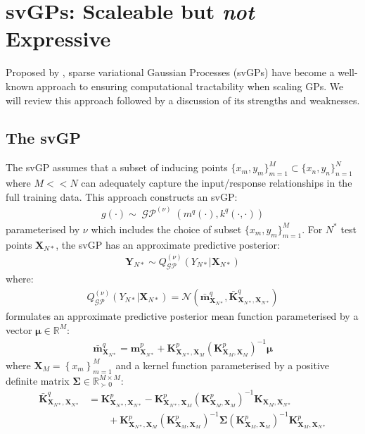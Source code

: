 \documentclass{article}
\newcommand{\GP}{\operatorname{\mathcal{GP}}}
\numberwithin{equation}{section}
\begin{document}
\newpage
\section{svGPs: Scaleable but \textit{not} Expressive}\label{section:the-svgp}
Proposed by \cite{titsias2009variational}, sparse variational Gaussian Processes (svGPs) have become a well-known approach to ensuring computational tractability when scaling GPs. We will review this approach followed by a discussion of its strengths and weaknesses.

\subsection{The svGP}
The svGP assumes that a subset of inducing points $\{x_m, y_m\}_{m=1}^{M} \subset \{x_n, y_n\}_{n=1}^{N}$ where $M << N$ can adequately capture the input/response relationships in the full training data. This approach constructs an svGP:
\begin{align}
g(\cdot) \sim \GP^{(\nu)}\left(m^{q}(\cdot), k^{q}(\cdot, \cdot)\right)
\label{svgp}
\end{align}
parameterised by $\nu$ which includes the choice of subset $\{x_m, y_m\}_{m=1}^{M}$. For $N^*$ test points $\mathbf{X}_{N*}$, the svGP has an approximate predictive posterior:
\begin{align}
    \mathbf{Y}_{N*} \sim Q_{\GP}^{(\nu)}\left(Y_{N*} \vert \mathbf{X}_{N*}\right)
\end{align}
where:
\begin{align}
    Q_{\GP}^{(\nu)}\left(Y_{N*} \vert \mathbf{X}_{N*}\right) = \mathcal{N}\left(\bar{\mathbf{m}}_{\mathbf{X}_{N*}}^{q}, \bar{\mathbf{K}}_{\mathbf{X}_{N*}, \mathbf{X}_{N*}}^{q}\right)
\end{align}
\cite{titsias2009variational} formulates an approximate predictive posterior mean function parameterised by a vector $\boldsymbol{\mu} \in \mathbb{R}^M$:
\begin{align}
    \label{svgp-mean} 
    \bar{\mathbf{m}}_{\mathbf{X}_{N*}}^{q} = \mathbf{m}^p_{\mathbf{X}_{N*}} + \mathbf{K}^p_{\mathbf{X}_{N*}, \mathbf{X}_M}\left(\mathbf{K}^p_{\mathbf{X}_M,\mathbf{X}_M}\right)^{-1} \boldsymbol{\mu}
\end{align}
where $\mathbf{X}_M = \left\{ x_m\right\}_{m=1}^M$ and a kernel function parameterised by a positive definite matrix $\mathbf{\Sigma} \in \mathbb{R}^{M\times M}_{\succ 0}$:
\begin{align}
\bar{\mathbf{K}}_{\mathbf{X}_{N*}, \mathbf{X}_{N*}}^{q} & = \mathbf{K}^p_{\mathbf{X}_{N*}, \mathbf{X}_{N*}} - \mathbf{K}^p_{\mathbf{X}_{N*}, \mathbf{X}_M} \left(\mathbf{K}^p_{\mathbf{X}_M, \mathbf{X}_M}\right)^{-1}\mathbf{K}_{\mathbf{X}_M, \mathbf{X}_{N*}} \nonumber \\
&\qquad + \mathbf{K}^p_{\mathbf{X}_{N*}, \mathbf{X}_M}  \left(\mathbf{K}^p_{\mathbf{X}_M, \mathbf{X}_M}\right)  ^{-1} \mathbf{\Sigma} \left(\mathbf{K}^p_{\mathbf{X}_M, \mathbf{X}_M}\right)^{-1}\mathbf{K}^p_{\mathbf{X}_M, \mathbf{X}_{N*}}
\label{svgp-covariance}
\end{align}
\end{document}
